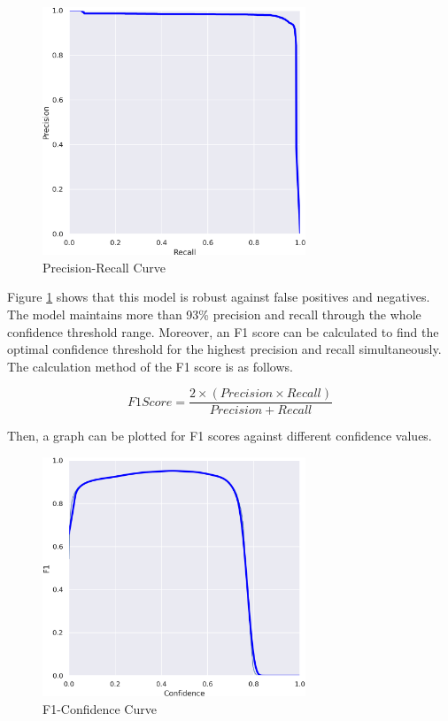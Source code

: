\begin{figure}[h]
    \centering
    \includegraphics[width=0.7\textwidth]{Images/PR_curve.png}
    \caption{Precision-Recall Curve}
    \label{prcurve}
\end{figure}

Figure \ref{prcurve} shows that this model is robust against false positives and negatives. The model maintains more than 93\% precision and recall through the whole confidence threshold range. Moreover, an F1 score can be calculated to find the optimal confidence threshold for the highest precision and recall simultaneously. The calculation method of the F1 score is as follows.

\begin{equation}
    F1 Score = \frac{2 \times (Precision \times Recall)}{Precision+Recall}
    \label{f1score}
\end{equation}

Then, a graph can be plotted for F1 scores against different confidence values. 

\begin{figure}[h]
    \centering
    \includegraphics[width=0.7\textwidth]{Images/F1_curve.png}
    \caption{F1-Confidence Curve}
    \label{f1curve}
\end{figure}

